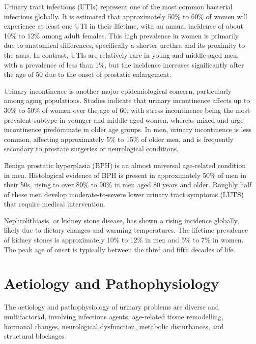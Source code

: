 Urinary tract infections (UTIs) represent one of the most common bacterial infections globally. It is estimated that approximately 50\% to 60\% of women will experience at least one UTI in their lifetime, with an annual incidence of about 10\% to 12\% among adult females. This high prevalence in women is primarily due to anatomical differences, specifically a shorter urethra and its proximity to the anus. In contrast, UTIs are relatively rare in young and middle-aged men, with a prevalence of less than 1\%, but the incidence increases significantly after the age of 50 due to the onset of prostatic enlargement.

Urinary incontinence is another major epidemiological concern, particularly among aging populations. Studies indicate that urinary incontinence affects up to 30\% to 50\% of women over the age of 60, with stress incontinence being the most prevalent subtype in younger and middle-aged women, whereas mixed and urge incontinence predominate in older age groups. In men, urinary incontinence is less common, affecting approximately 5\% to 15\% of older men, and is frequently secondary to prostate surgeries or neurological conditions.

Benign prostatic hyperplasia (BPH) is an almost universal age-related condition in men. Histological evidence of BPH is present in approximately 50\% of men in their 50s, rising to over 80\% to 90\% in men aged 80 years and older. Roughly half of these men develop moderate-to-severe lower urinary tract symptoms (LUTS) that require medical intervention.

Nephrolithiasis, or kidney stone disease, has shown a rising incidence globally, likely due to dietary changes and warming temperatures. The lifetime prevalence of kidney stones is approximately 10\% to 12\% in men and 5\% to 7\% in women. The peak age of onset is typically between the third and fifth decades of life.

\section*{Aetiology and Pathophysiology}
The aetiology and pathophysiology of urinary problems are diverse and multifactorial, involving infectious agents, age-related tissue remodelling, hormonal changes, neurological dysfunction, metabolic disturbances, and structural blockages.

